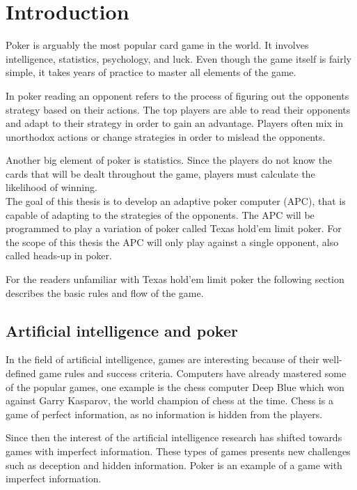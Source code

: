 \section*{Introduction}
Poker is arguably the most popular card game in the world. It involves intelligence, statistics, psychology, and luck. Even though the game itself is fairly simple, it takes years of practice to master all elements of the game.

In poker reading an opponent refers to the process of figuring out the opponents strategy based on their actions. The top players are able to read their opponents and adapt to their strategy in order to gain an advantage. Players often mix in unorthodox actions or change strategies in order to mislead the opponents.

Another big element of poker is statistics. Since the players do not know the cards that will be dealt throughout the game, players must calculate the likelihood of winning. \\

The goal of this thesis is to develop an adaptive poker computer (APC), that is capable of adapting to the strategies of the opponents. The APC will be programmed to play a variation of poker called Texas hold'em limit poker. For the scope of this thesis the APC will only play against a single opponent, also called heads-up in poker.

For the readers unfamiliar with Texas hold'em limit poker the following section describes the basic rules and flow of the game.



\subsection*{Artificial intelligence and poker}
In the field of artificial intelligence, games are interesting because of their well-defined game rules and success criteria.
Computers have already mastered some of the popular games, one example is the chess computer Deep Blue which won against Garry Kasparov, the world champion of chess at the time.
Chess is a game of perfect information, as no information is hidden from the players.

Since then the interest of the artificial intelligence research has shifted towards games with imperfect information. These types of games presents new challenges such as deception and hidden information. Poker is an example of a game with imperfect information.\\

